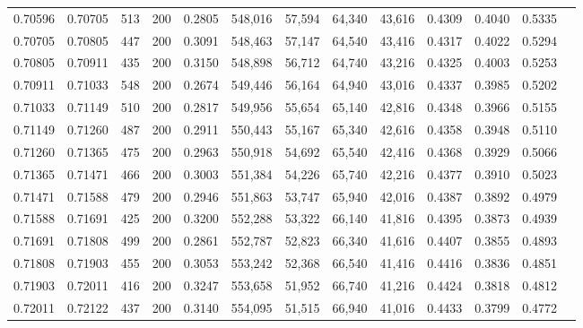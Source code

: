 \begin{tabular}{rrrrrrrrrrrrr}
0.70596 & 0.70705 &    513 & 200 &                                     0.2805 & 548,016 &  57,594 &  64,340 &  43,616 & 0.4309 & 0.4040 & 0.5335 \\
0.70705 & 0.70805 &    447 & 200 &                                     0.3091 & 548,463 &  57,147 &  64,540 &  43,416 & 0.4317 & 0.4022 & 0.5294 \\
0.70805 & 0.70911 &    435 & 200 &                                     0.3150 & 548,898 &  56,712 &  64,740 &  43,216 & 0.4325 & 0.4003 & 0.5253 \\
0.70911 & 0.71033 &    548 & 200 &                                     0.2674 & 549,446 &  56,164 &  64,940 &  43,016 & 0.4337 & 0.3985 & 0.5202 \\
0.71033 & 0.71149 &    510 & 200 &                                     0.2817 & 549,956 &  55,654 &  65,140 &  42,816 & 0.4348 & 0.3966 & 0.5155 \\
0.71149 & 0.71260 &    487 & 200 &                                     0.2911 & 550,443 &  55,167 &  65,340 &  42,616 & 0.4358 & 0.3948 & 0.5110 \\
0.71260 & 0.71365 &    475 & 200 &                                     0.2963 & 550,918 &  54,692 &  65,540 &  42,416 & 0.4368 & 0.3929 & 0.5066 \\
0.71365 & 0.71471 &    466 & 200 &                                     0.3003 & 551,384 &  54,226 &  65,740 &  42,216 & 0.4377 & 0.3910 & 0.5023 \\
0.71471 & 0.71588 &    479 & 200 &                                     0.2946 & 551,863 &  53,747 &  65,940 &  42,016 & 0.4387 & 0.3892 & 0.4979 \\
0.71588 & 0.71691 &    425 & 200 &                                     0.3200 & 552,288 &  53,322 &  66,140 &  41,816 & 0.4395 & 0.3873 & 0.4939 \\
0.71691 & 0.71808 &    499 & 200 &                                     0.2861 & 552,787 &  52,823 &  66,340 &  41,616 & 0.4407 & 0.3855 & 0.4893 \\
0.71808 & 0.71903 &    455 & 200 &                                     0.3053 & 553,242 &  52,368 &  66,540 &  41,416 & 0.4416 & 0.3836 & 0.4851 \\
0.71903 & 0.72011 &    416 & 200 &                                     0.3247 & 553,658 &  51,952 &  66,740 &  41,216 & 0.4424 & 0.3818 & 0.4812 \\
0.72011 & 0.72122 &    437 & 200 &                                     0.3140 & 554,095 &  51,515 &  66,940 &  41,016 & 0.4433 & 0.3799 & 0.4772 \\

\end{tabular}
